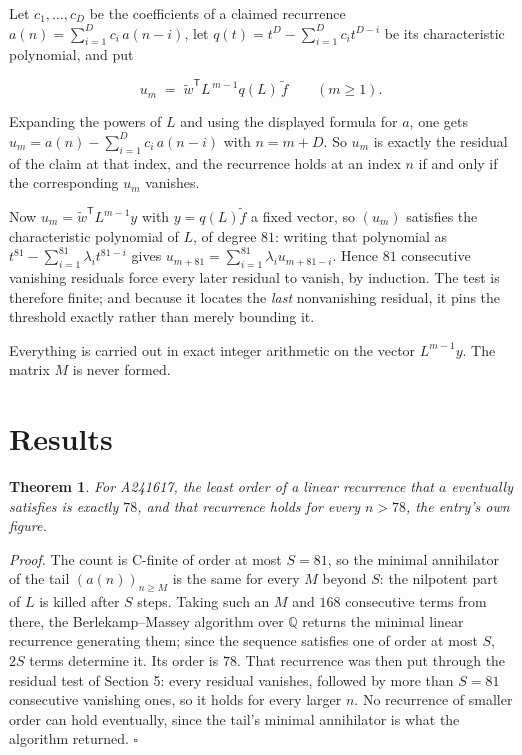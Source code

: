 \documentclass[11pt]{article}
\newtheorem{theorem}{Theorem}
\theoremstyle{definition}
\begin{document}
Let $c_1,\dots,c_D$ be the coefficients of a claimed recurrence $a(n) = \sum_{i=1}^{D} c_i\,a(n-i)$, let $q(t) = t^{D} - \sum_{i=1}^{D} c_i t^{D-i}$ be its characteristic polynomial, and put

\[u_m \;=\; \tilde w^{\mathsf T} L^{\,m-1} q(L)\,\tilde f \qquad (m \ge 1).\]

Expanding the powers of $L$ and using the displayed formula for $a$, one gets $u_m = a(n) - \sum_{i=1}^{D} c_i\,a(n-i)$ with $n = m + D$. So $u_m$ is exactly the residual of the claim at that index, and the recurrence holds at an index $n$ if and only if the corresponding $u_m$ vanishes.

Now $u_m = \tilde w^{\mathsf T} L^{m-1} y$ with $y = q(L)\tilde f$ a fixed vector, so $(u_m)$ satisfies the characteristic polynomial of $L$, of degree $81$: writing that polynomial as $t^{81} - \sum_{i=1}^{81} \lambda_i t^{81-i}$ gives $u_{m+81} = \sum_{i=1}^{81} \lambda_i u_{m+81-i}$. Hence $81$ consecutive vanishing residuals force every later residual to vanish, by induction. The test is therefore finite; and because it locates the {\itshape last} nonvanishing residual, it pins the threshold exactly rather than merely bounding it.

Everything is carried out in exact integer arithmetic on the vector $L^{m-1}y$. The matrix $M$ is never formed.

\section{Results}

\begin{theorem} For A241617, the least order of a linear recurrence that $a$ eventually satisfies is exactly $78$, and that recurrence holds for every $n > 78$, the entry's own figure.\end{theorem}

{\itshape Proof.} The count is C-finite of order at most $S = 81$, so the minimal annihilator of the tail $(a(n))_{n \ge M}$ is the same for every $M$ beyond $S$: the nilpotent part of $L$ is killed after $S$ steps. Taking such an $M$ and $168$ consecutive terms from there, the Berlekamp--Massey algorithm over $\mathbb{Q}$ returns the minimal linear recurrence generating them; since the sequence satisfies one of order at most $S$, $2S$ terms determine it. Its order is $78$. That recurrence was then put through the residual test of Section 5: every residual vanishes, followed by more than $S = 81$ consecutive vanishing ones, so it holds for every larger $n$. No recurrence of smaller order can hold eventually, since the tail's minimal annihilator is what the algorithm returned. $\square$
\end{document}
